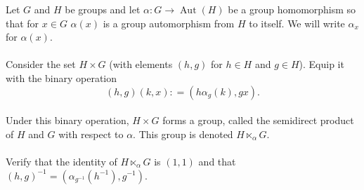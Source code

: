 \documentclass[12 pt, letterpaper]{hmcpset}
\begin{document}
\begin{problem}[1.]
	Let $G$ and $H$ be groups and let $\alpha : G \to \operatorname{Aut}(H)$ be a group homomorphism so that for $x \in G$ $\alpha(x)$ is a group automorphism from $H$ to itself. We will write $\alpha_{x}$ for $\alpha(x)$. \\\\
	Consider the set $H \times G$ (with elements $(h, g)$ for $h \in H$ and $g \in H$). Equip it with the binary operation
	\[
		(h, g)(k, x) : = (h \alpha_{g}(k), gx).
	\]\\
	Under this binary operation, $H \times G$ forms a group, called the semidirect product of $H$ and $G$ with respect to $\alpha$. This group is denoted $H \ltimes_{\alpha} G$. \\\\
	Verify that the identity of $H \ltimes_{\alpha} G$ is $(1, 1)$ and that $(h, g)^{-1} = (\alpha_{g^{-1}}(h^{-1}), g^{-1})$.
\end{problem}
\end{document}
